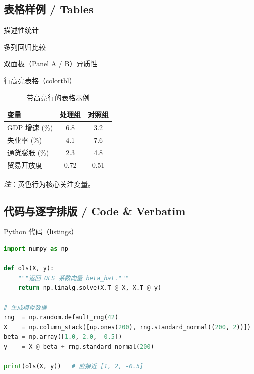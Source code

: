 \subsection{表格样例 / Tables}

\begin{frame}{描述性统计}
  
\end{frame}

\begin{frame}{多列回归比较}
  
\end{frame}

\begin{frame}[shrink=20]{双面板（Panel A / B）异质性}
  
\end{frame}

\begin{frame}{行高亮表格（colortbl）}
  \begin{table}
    \centering
    \caption{带高亮行的表格示例}
    \begin{tabular}{lcc}
      \toprule
      变量 & 处理组 & 对照组 \\
      \midrule
      \rowcolor{yellow!30}
      GDP 增速 (\%) & 6.8 & 3.2 \\
      失业率 (\%)   & 4.1 & 7.6 \\
      \rowcolor{yellow!30}
      通货膨胀 (\%) & 2.3 & 4.8 \\
      贸易开放度    & 0.72 & 0.51 \\
      \bottomrule
    \end{tabular}
  \end{table}
  {\footnotesize \textit{注}：黄色行为核心关注变量。}
\end{frame}

\subsection{代码与逐字排版 / Code \& Verbatim}

\begin{frame}[fragile]{Python 代码（listings）}
  \begin{lstlisting}[language=Python, caption={OLS 估计量（NumPy 实现）}]
import numpy as np

def ols(X, y):
    """返回 OLS 系数向量 beta_hat."""
    return np.linalg.solve(X.T @ X, X.T @ y)

# 生成模拟数据
rng  = np.random.default_rng(42)
X    = np.column_stack([np.ones(200), rng.standard_normal((200, 2))])
beta = np.array([1.0, 2.0, -0.5])
y    = X @ beta + rng.standard_normal(200)

print(ols(X, y))   # 应接近 [1, 2, -0.5]
  \end{lstlisting}
\end{frame}

